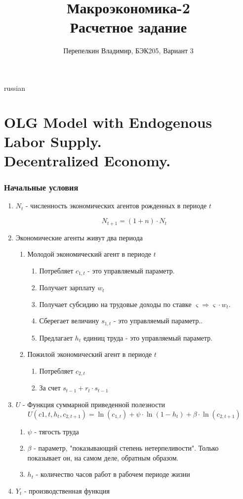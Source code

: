 \documentclass[fleqn]{article}
\begin{document}
\title{\foreignlanguage{russian}{Макроэкономика-2\\Расчетное задание}}
\author{\foreignlanguage{russian}{Перепелкин Владимир, БЭК205, Вариант 3}}
\maketitle
\begin{otherlanguage*}{russian}

\section*{OLG Model with Endogenous Labor Supply. \\Decentralized Economy.}
\subsubsection*{Начальные условия}
\begin{enumerate}
\item $N_t$ - численность экономических агентов рожденных в периоде $ t $ 

$$ N_{t+1} = (1 + n) \cdot N_t $$

\item Экономические агенты живут два периода 
\begin{enumerate}
\item Молодой экономический агент в периоде $ t $ 
\begin{enumerate}
\item Потребляет $ c_{1, t}$ - это управляемый параметр. 
\item Получает зарплату $ w_t $ 
\item Получает субсидию на трудовые доходы по ставке $ \varsigma \Rightarrow \varsigma \cdot w_t $.
\item Сберегает величину $ s_{1, t} $  - это управляемый параметр..
\item Предлагает $ h_t $ единиц труда - это управляемый параметр.
\end{enumerate}
\item Пожилой экономический агент в периоде $ t $ 
\begin{enumerate}
\item Потребляет $ c_{2, t} $ 
\item За счет $ s_{t-1} + r_t \cdot s_{t-1} $ 
\end{enumerate}
\end{enumerate}
\item $U$ - Функция суммарной приведенной полезности
$$ U(c{1, t}, h_t, c_{2, t+1}) = \ln (c_{1, t}) + \psi \cdot \ln (1 - h_t) + \beta \cdot \ln (c_{2, t+1}) $$
\begin{enumerate}
\item $ \psi$ - тягость труда  
\item $ \beta $ - параметр, "показывающий степень нетерпеливости". Только показывает он, на самом деле, обратным образом.
\item $ h_t $ - количество часов работ в рабочем периоде жизни 
\end{enumerate}	
\item $Y_t$ - производственная функция 


\end{enumerate}
\end{otherlanguage*}
\end{document}
